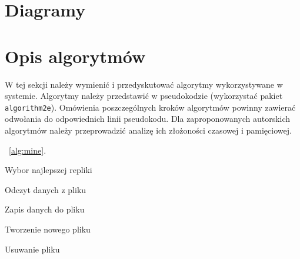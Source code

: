 \newpage





\section{Diagramy}

\section{Opis algorytmów}

W tej sekcji należy wymienić i przedyskutować algorytmy wykorzystywane w systemie. Algorytmy należy przedstawić w pseudokodzie (wykorzystać pakiet \texttt{algorithm2e}). Omówienia poszczególnych kroków algorytmów powinny zawierać odwołania do odpowiednich linii pseudokodu. Dla zaproponowanych autorskich algorytmów należy przeprowadzić analizę ich złożoności czasowej i pamięciowej. 

~\ref{alg:mine}.

{\small
\begin{pseudokod}[H]
\caption{Wybor najlepszej repliki}\label{alg:mine}
\end{pseudokod}
}

{\small
\begin{pseudokod}[H]
\caption{Odczyt danych z pliku}\label{alg:mine}
\end{pseudokod}
}

{\small
\begin{pseudokod}[H]
\caption{Zapis danych do pliku}\label{alg:mine}
\end{pseudokod}
}

{\small
\begin{pseudokod}[H]
\caption{Tworzenie nowego pliku}\label{alg:mine}
\end{pseudokod}
}

{\small
\begin{pseudokod}[H]
\caption{Usuwanie pliku}\label{alg:mine}
\end{pseudokod}
}

